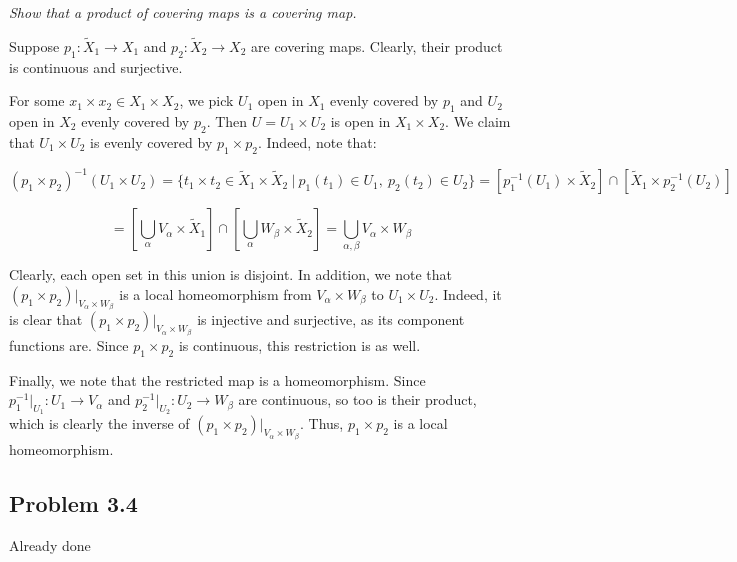 \documentclass[10pt, oneside]{amsart}
\begin{document}
    \textit{Show that a product of covering maps is a covering map.}
    \newline

    Suppose $p_1 : \tilde{X}_1 \rightarrow X_1$ and $p_2 : \tilde{X}_2 \rightarrow X_2$ are covering maps. Clearly, their product is continuous and surjective.
    \newline

    For some $x_1 \times x_2 \in X_1 \times X_2$, we pick $U_1$ open in
    $X_1$ evenly covered by $p_1$ and $U_2$ open in $X_2$ evenly covered by $p_2$. Then $U = U_1 \times U_2$ is open in $X_1 \times X_2$. We claim that $U_1 \times U_2$ is evenly covered by $p_1 \times p_2$. Indeed,
    note that:

    $$(p_1 \times p_2)^{-1}(U_1 \times U_2) = \{ t_1 \times t_2 \in \tilde{X}_1 \times \tilde{X}_2 \ | \ p_1(t_1) \in U_1, \ p_2(t_2) \in U_2 \} = \left[ p_1^{-1}(U_1) \times \tilde{X}_2 \right] \cap \left[ \tilde{X}_1 \times p_2^{-1}(U_2) \right]$$

    $$ = \left[ \displaystyle\bigcup_{\alpha} V_{\alpha} \times \tilde{X}_1 \right] \cap \left[ \displaystyle\bigcup_{\alpha} W_{\beta} \times \tilde{X}_2 \right] = \displaystyle\bigcup_{\alpha, \beta} V_{\alpha} \times W_{\beta}$$

    Clearly, each open set in this union is disjoint. In addition, we note that $(p_1 \times p_2)|_{V_{\alpha} \times W_{\beta}}$ is a local homeomorphism from $V_{\alpha} \times W_{\beta}$ to $U_1 \times U_2$. Indeed,
    it is clear that $(p_1 \times p_2)|_{V_{\alpha} \times W_{\beta}}$ is injective and surjective, as its component functions are. Since $p_1 \times p_2$ is continuous, this restriction is as well.
    \newline

    Finally, we note that the restricted map is a homeomorphism. Since $p_1^{-1}|_{U_1} : U_1 \rightarrow V_{\alpha}$ and $p_2^{-1}|_{U_2} : U_2 \rightarrow W_{\beta}$ are continuous, so too is their product, which
    is clearly the inverse of $(p_1 \times p_2)|_{V_{\alpha} \times W_{\beta}}$. Thus, $p_1 \times p_2$ is a local homeomorphism.

    \hrulefill

    \subsection{Problem 3.4}

    Already done
    \newline
\end{document}
